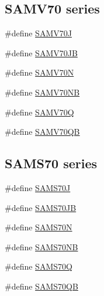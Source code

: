 \subsection*{S\+A\+M\+V70 series}
\begin{DoxyCompactItemize}
\item 
\#define \mbox{\hyperlink{group__sam__part__macros__group_gaa6cb4c3856c6856a57ec9f443d239527}{S\+A\+M\+V70J}}
\item 
\#define \mbox{\hyperlink{group__sam__part__macros__group_ga5ec7d7853fd7dc3b0d5e686f3f2df869}{S\+A\+M\+V70\+JB}}
\item 
\#define \mbox{\hyperlink{group__sam__part__macros__group_ga03d76f8d5034b894e50dabd497e64992}{S\+A\+M\+V70N}}
\item 
\#define \mbox{\hyperlink{group__sam__part__macros__group_ga2bafab3273c42c12eb7180d70de301df}{S\+A\+M\+V70\+NB}}
\item 
\#define \mbox{\hyperlink{group__sam__part__macros__group_ga70156b9e7c7f2ac6eaf8e04f73e01801}{S\+A\+M\+V70Q}}
\item 
\#define \mbox{\hyperlink{group__sam__part__macros__group_ga560e2809040715920c242312dbe99b17}{S\+A\+M\+V70\+QB}}
\end{DoxyCompactItemize}
\subsection*{S\+A\+M\+S70 series}
\begin{DoxyCompactItemize}
\item 
\#define \mbox{\hyperlink{group__sam__part__macros__group_gaf1a96c282da9b05972a653cf0b03b1a2}{S\+A\+M\+S70J}}
\item 
\#define \mbox{\hyperlink{group__sam__part__macros__group_gaec6e38f478ca1b4b598f598d3e1fb3ff}{S\+A\+M\+S70\+JB}}
\item 
\#define \mbox{\hyperlink{group__sam__part__macros__group_ga058ef2915b804280b5d38280a5b2bae3}{S\+A\+M\+S70N}}
\item 
\#define \mbox{\hyperlink{group__sam__part__macros__group_ga7a21f0445e52881a10dcf99486ea5332}{S\+A\+M\+S70\+NB}}
\item 
\#define \mbox{\hyperlink{group__sam__part__macros__group_ga3cc6724a7388e59987ccd2b9c9b3e0eb}{S\+A\+M\+S70Q}}
\item 
\#define \mbox{\hyperlink{group__sam__part__macros__group_ga7597e22e69b9ad51c748d9fbcc3c0a9e}{S\+A\+M\+S70\+QB}}
\end{DoxyCompactItemize}
